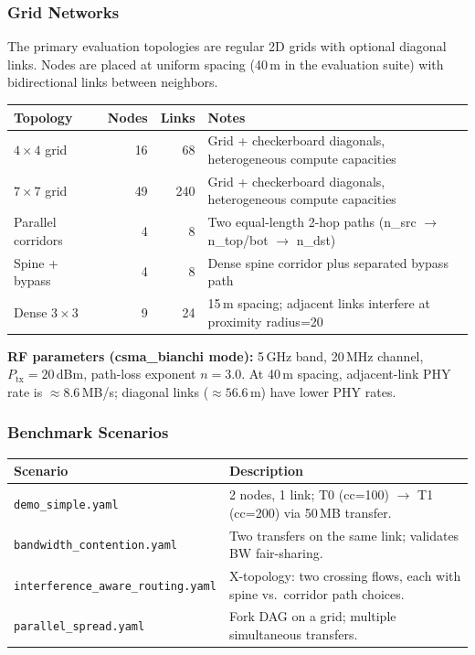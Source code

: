 \documentclass[11pt]{article}
\begin{document}
\subsubsection{Grid Networks}

The primary evaluation topologies are regular 2D grids with optional
diagonal links.  Nodes are placed at uniform spacing (40\,m in the
evaluation suite) with bidirectional links between neighbors.

\begin{table}[h]
\centering
\begin{tabular}{lrrp{6cm}}
\toprule
\textbf{Topology} & \textbf{Nodes} & \textbf{Links} & \textbf{Notes} \\
\midrule
$4\times4$ grid & 16 & 68  & Grid + checkerboard diagonals, heterogeneous compute capacities \\
$7\times7$ grid & 49 & 240 & Grid + checkerboard diagonals, heterogeneous compute capacities \\
Parallel corridors & 4 & 8 & Two equal-length 2-hop paths (n\_src $\to$ n\_top/bot $\to$ n\_dst) \\
Spine + bypass & 4 & 8 & Dense spine corridor plus separated bypass path \\
Dense $3\times3$ & 9 & 24 & 15\,m spacing; adjacent links interfere at proximity radius=20 \\
\bottomrule
\end{tabular}
\end{table}

\medskip
\textbf{RF parameters (csma\_bianchi mode):}
5\,GHz band, 20\,MHz channel, $P_{\mathrm{tx}} = 20$\,dBm, path-loss exponent $n = 3.0$.
At 40\,m spacing, adjacent-link PHY rate is $\approx 8.6$\,MB/s; diagonal
links ($\approx 56.6$\,m) have lower PHY rates.

\subsubsection{Benchmark Scenarios}

\begin{table}[h]
\centering
\begin{tabular}{lp{10cm}}
\toprule
\textbf{Scenario} & \textbf{Description} \\
\midrule
\texttt{demo\_simple.yaml} & 2 nodes, 1 link; T0 (cc=100) $\to$ T1 (cc=200) via 50\,MB transfer. \\
\texttt{bandwidth\_contention.yaml} & Two transfers on the same link; validates BW fair-sharing. \\
\texttt{interference\_aware\_routing.yaml} & X-topology: two crossing flows, each with spine vs.\ corridor path choices. \\
\texttt{parallel\_spread.yaml} & Fork DAG on a grid; multiple simultaneous transfers. \\
\bottomrule
\end{tabular}
\end{table}
\end{document}
